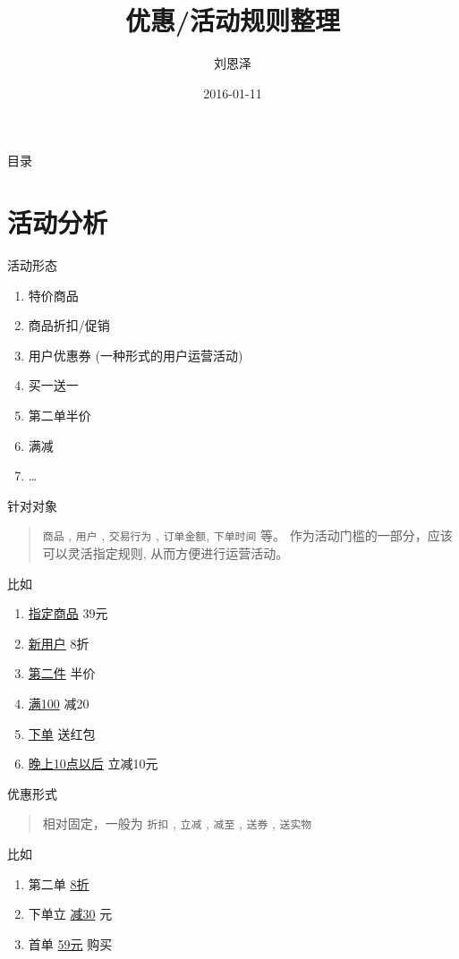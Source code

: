 \documentclass[presentation, bigger]{beamer}
\author{刘恩泽}
\date{2016-01-11}
\title{优惠/活动规则整理}
\begin{document}
\maketitle
\begin{frame}{目录}
\tableofcontents
\end{frame}



\section{活动分析}
\label{sec:orgheadline6}

\begin{frame}[label={sec:orgheadline1}]{活动形态}
\begin{enumerate}
\item 特价商品
\item 商品折扣/促销
\item 用户优惠券 (一种形式的用户运营活动)
\item 买一送一
\item 第二单半价
\item 满减
\item \ldots{}
\end{enumerate}
\end{frame}

\begin{frame}[fragile,label={sec:orgheadline2}]{针对对象}
 \begin{quote}
\texttt{商品} , \texttt{用户} , \texttt{交易行为} , \texttt{订单金额}, \texttt{下单时间} 等。 作为活动门槛的一部分，应该可以灵活指定规则, 从而方便进行运营活动。
\end{quote}

\begin{block}{比如}
\begin{enumerate}
\item \uline{指定商品} 39元
\item \uline{新用户} 8折
\item \uline{第二件} 半价
\item \uline{满100} 减20
\item \uline{下单} 送红包
\item \uline{晚上10点以后} 立减10元
\end{enumerate}
\end{block}
\end{frame}

\begin{frame}[fragile,label={sec:orgheadline3}]{优惠形式}
 \begin{quote}
相对固定，一般为 \texttt{折扣} , \texttt{立减} , \texttt{减至} , \texttt{送券} , \texttt{送实物}
\end{quote}

\begin{block}{比如}
\begin{enumerate}
\item 第二单 \uline{8折}
\item 下单立 \uline{减30} 元
\item 首单 \uline{59元} 购买
\end{enumerate}
\end{block}
\end{frame}
\end{document}
